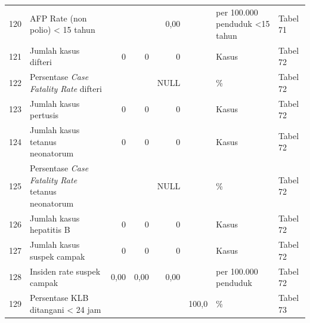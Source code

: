 \begin{small}
\begin{longtable}{rY{12em}rrrrY{5em}Y{5em}}
	                  120 & AFP Rate (non polio) < 15 tahun                                                                         &        &        &    0,00 &                    & per 100.000 penduduk <15 tahun & Tabel 71 \\
	121 & Jumlah kasus difteri                                                                                    &      0 &      0 &       0 &                    & Kasus                          & Tabel 72 \\
	                  122 & Persentase \textit{Case Fatality Rate} difteri                                                          &        &        &    NULL &                    & \%                             & Tabel 72 \\
	123 & Jumlah kasus pertusis                                                                                   &      0 &      0 &       0 &                    & Kasus                          & Tabel 72 \\
	                  124 & Jumlah kasus tetanus neonatorum                                                                         &      0 &      0 &       0 &                    & Kasus                          & Tabel 72 \\
	125 & Persentase \textit{Case Fatality Rate} tetanus neonatorum                                               &        &        &    NULL &                    & \%                             & Tabel 72 \\
	                  126 & Jumlah kasus hepatitis B                                                                                &      0 &      0 &       0 &                    & Kasus                          & Tabel 72 \\
	127 & Jumlah kasus suspek campak                                                                              &      0 &      0 &       0 &                    & Kasus                          & Tabel 72 \\
	                  128 & Insiden rate suspek campak                                                                              &   0,00 &   0,00 &    0,00 &                    & per 100.000 penduduk           & Tabel 72 \\
	129 & Persentase KLB ditangani < 24 jam                                                                       &        &        &         &              100,0 & \%                             & Tabel 73 \\

\end{longtable}
\end{small}
